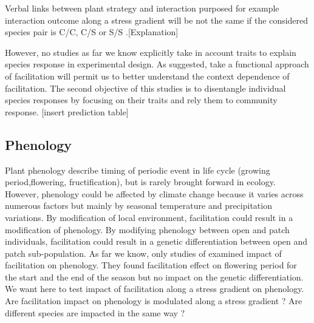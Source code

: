 \documentclass[12pt]{article} %
\begin{document}
Verbal links between plant strategy and interaction purposed for example interaction outcome along a stress gradient will be not the same if the considered species pair is C/C, C/S or S/S \citep{Maestre2009}.[Explanation]

However, no studies as far we know explicitly take in account traits to explain species response in experimental design. As \citet{Butterfield2013} suggested, take a functional approach of facilitation will permit us to better understand the context dependence of facilitation. The second objective of this studies is to disentangle individual species responses by focusing on their traits and rely them to community response. 
[insert prediction table]

\subsection{Phenology}
Plant phenology describe timing of periodic event in life cycle (growing period,flowering, fructification), but is rarely brought forward in ecology.
However, phenology could be affected by climate change \citep{Cleland2007} because it varies across numerous factors but mainly by seasonal temperature and precipitation variations. By modification of local environment, facilitation could result in a modification of phenology. By modifying phenology between open and patch individuals, facilitation could result in a genetic differentiation between open and patch sub-population. As far we know, only studies of \citet{Castellanos2014} examined impact of facilitation on phenology. They found facilitation effect on flowering period for the start and the end of the season but no impact on the genetic differentiation. We want here to test impact of facilitation along a stress gradient on phenology. Are facilitation impact on phenology is modulated along a stress gradient ? Are different species are impacted in the same way ?
\end{document}
